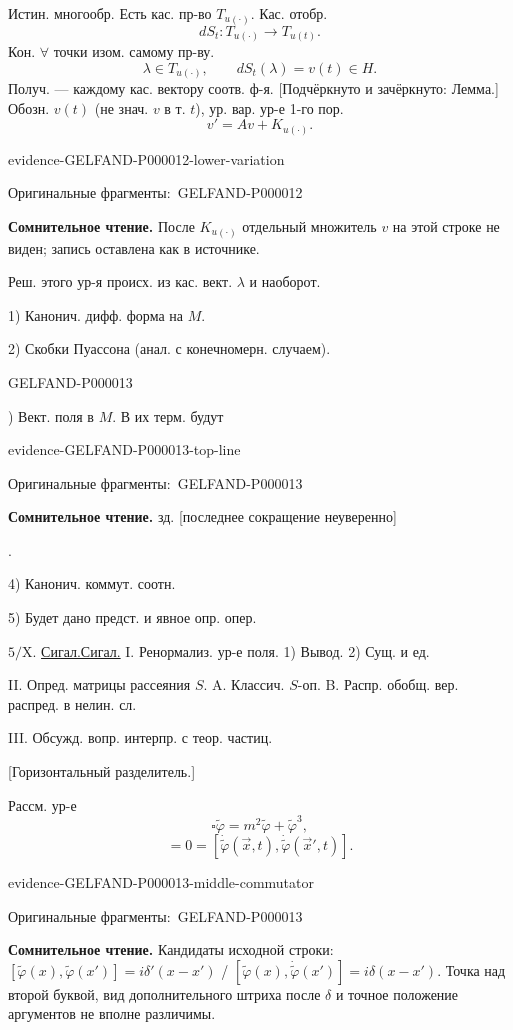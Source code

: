 \documentclass[11pt]{article}
\let\MathUnderline\underline
\renewcommand{\underline}[1]{\ifmmode\MathUnderline{#1}\else\uline{#1}\fi}
\newcommand{\SourcePage}[2]{\par\smallskip\phantomsection\label{#1:source-page}{\small\sffamily\color{blue!55!black}#1}\par\smallskip}
\newcommand{\EvidenceBlock}[4]{%
 \par\smallskip\noindent\begin{minipage}{\linewidth}
 \begin{minipage}[t]{.47\linewidth}\vspace{0pt}\centering
 \csname evidence-#1-#2\endcsname\par
 {\scriptsize\SourceCropCaption\ #1}\par
 \end{minipage}\hfill
 \begin{minipage}[t]{.49\linewidth}\vspace{0pt}\raggedright
 {\small\color{orange!65!black}\textbf{#4} #3}\par
 \end{minipage}
 \end{minipage}\par\smallskip}
\newcommand{\Unclear}[3]{\EvidenceBlock{#1}{#2}{#3}{\ReadingCaption}}
\newcommand{\SourceCropCaption}{Оригинальные фрагменты:}\newcommand{\ReadingCaption}{Сомнительное чтение.}\newcommand{\IncompleteCaption}{Неразобранный фрагмент.}\newcommand{\DiagramCaption}{Рисунок и набранное описание.}
\begin{document}
Истин. многообр.
Есть кас. пр-во $T_{u(\cdot)}$.
Кас. отобр.
\begin{equation*}
dS_t:T_{u(\cdot)}\longrightarrow T_{u(t)}.
\end{equation*}
Кон. $\forall$ точки изом. самому пр-ву.
\begin{equation*}
\lambda\in T_{u(\cdot)},\qquad dS_t(\lambda)=v(t)\in H.
\end{equation*}
Получ. --- каждому кас. вектору соотв. ф-я.
[Подчёркнуто и зачёркнуто: Лемма.]
Обозн. $v(t)$ (не знач. $v$ в т. $t$), ур. вар. ур-е 1-го пор.
\begin{equation*}
v'=Av+K_{u(\cdot)}.
\end{equation*}
\Unclear{GELFAND-P000012}{lower-variation}{После $K_{u(\cdot)}$ отдельный множитель $v$ на этой строке не виден; запись оставлена как в источнике.}
Реш. этого ур-я происх. из кас. вект. $\lambda$ и наоборот.

1) Канонич. дифф. форма на $M$.

2) Скобки Пуассона (анал. с конечномерн. случаем).



\SourcePage{GELFAND-P000013}{7}
3) Вект. поля в $M$. В их терм. будут \Unclear{GELFAND-P000013}{top-line}{зд. [последнее сокращение неуверенно]}.

4) Канонич. коммут. соотн.

5) Будет дано предст. и явное опр. опер.

$5/\mathrm X$. \underline{Сигал.}
I. Ренормализ. ур-е поля.
1) Вывод. 2) Сущ. и ед.

II. Опред. матрицы рассеяния $S$.
A. Классич. $S$-оп.
B. Распр. обобщ. вер. распред. в нелин. сл.

III. Обсужд. вопр. интерпр. с теор. частиц.

[Горизонтальный разделитель.]

Рассм. ур-е
\begin{equation*}
\square\widetilde\varphi=m^2\widetilde\varphi+\widetilde\varphi^3,
\end{equation*}
\begin{equation*}
[\widetilde\varphi(\vec x,t),\widetilde\varphi(\vec x',t)]
=0=[\dot{\widetilde\varphi}(\vec x,t),\dot{\widetilde\varphi}(\vec x',t)].
\end{equation*}
\Unclear{GELFAND-P000013}{middle-commutator}{Кандидаты исходной строки: $[\widetilde\varphi(x),\widetilde\varphi(x')]=i\delta'(x-x')$ / $[\widetilde\varphi(x),\dot{\widetilde\varphi}(x')]=i\delta(x-x')$. Точка над второй буквой, вид дополнительного штриха после $\delta$ и точное положение аргументов не вполне различимы.}
\end{document}

